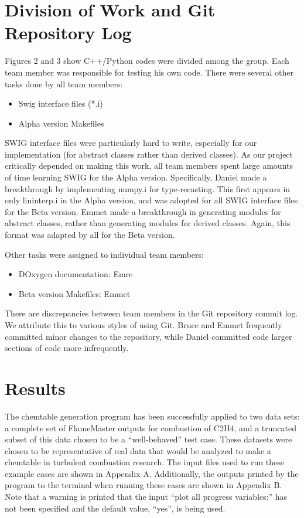 \documentclass[11pt]{article}
\begin{document}

\section{Division of Work and Git Repository Log}
Figures 2 and 3 show C++/Python codes were divided among the group. Each team member was responsible for testing his own code. There were several other tasks done by all team members:
\begin{itemize}
\item Swig interface files (*.i)
\item Alpha version Makefiles
\end{itemize}
SWIG interface files were particularly hard to write, especially for our implementation (for abstract classes rather than derived classes). As our project critically depended on making this work, all team members spent large amounts of time learning SWIG for the Alpha version. Specifically, Daniel made a breakthrough by implementing numpy.i for type-recasting. This first appears in only lininterp.i in the Alpha version, and was adopted for all SWIG interface files for the Beta version. Emmet made a breakthrough in generating modules for abstract classes, rather than generating modules for derived classes. Again, this format was adapted by all for the Beta version. 

Other tasks were assigned to individual team members:
\begin{itemize}
\item DOxygen documentation: Emre
\item Beta version Makefiles: Emmet
\end{itemize}

There are discrepancies between team members in the Git repository commit log. We attribute this to various styles of using Git. Bruce and Emmet frequently committed minor changes to the repository, while Daniel committed code larger sections of code more infrequently. 

\section{Results}

The chemtable generation program has been successfully applied to two data sets: a complete set of FlameMaster outputs for combustion of C2H4, and a truncated subset of this data chosen to be a “well-behaved” test case. These datasets were chosen to be representative of real data that would be analyzed to make a chemtable in turbulent combustion research. The input files used to run these example cases are shown in Appendix A. Additionally, the outputs printed by the program to the terminal when running these cases are shown in Appendix B. Note that a warning is printed that the input “plot all progress variables:” has not been specified and the default value, “yes”, is being used. 
\end{document}
